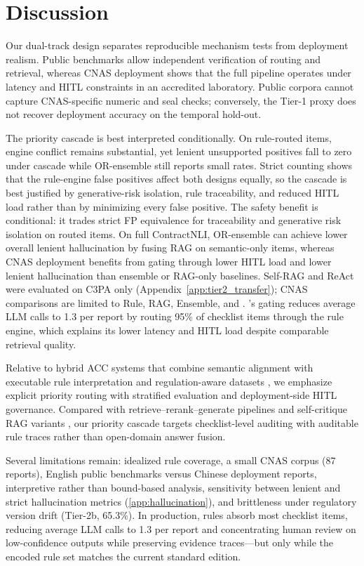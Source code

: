 \section{Discussion}
\label{sec:discussion}

Our dual-track design separates reproducible mechanism tests from deployment realism. Public benchmarks allow independent verification of routing and retrieval, whereas CNAS deployment shows that the full pipeline operates under latency and HITL constraints in an accredited laboratory. Public corpora cannot capture CNAS-specific numeric and seal checks; conversely, the Tier-1 proxy does not recover deployment accuracy on the temporal hold-out.

The priority cascade is best interpreted conditionally. On rule-routed items, engine conflict remains substantial, yet lenient unsupported positives fall to zero under cascade while OR-ensemble still reports small rates. Strict counting shows that the rule-engine false positives affect both designs equally, so the cascade is best justified by generative-risk isolation, rule traceability, and reduced HITL load rather than by minimizing every false positive. The safety benefit is conditional: it trades strict FP equivalence for traceability and generative risk isolation on routed items. On full ContractNLI, OR-ensemble can achieve lower overall lenient hallucination by fusing RAG on semantic-only items, whereas CNAS deployment benefits from gating through lower HITL load and lower lenient hallucination than ensemble or RAG-only baselines. Self-RAG and ReAct were evaluated on C3PA only (Appendix~\ref{app:tier2_transfer}); CNAS comparisons are limited to Rule, RAG, Ensemble, and \HRAG{}. \HRAG{}'s gating reduces average LLM calls to 1.3 per report by routing 95\% of checklist items through the rule engine, which explains its lower latency and HITL load despite comparable retrieval quality.

Relative to hybrid ACC systems that combine semantic alignment with executable rule interpretation \cite{zhang2016acc,zheng2022acc} and regulation-aware datasets \cite{c3pa2024,koreeda2021contractnli}, we emphasize explicit priority routing with stratified evaluation and deployment-side HITL governance. Compared with retrieve--rerank--generate pipelines and self-critique RAG variants \cite{glass2022re2g,asai2023selfrag}, our priority cascade targets checklist-level auditing with auditable rule traces rather than open-domain answer fusion.

Several limitations remain: idealized rule coverage, a small CNAS corpus (87 reports), English public benchmarks versus Chinese deployment reports, interpretive rather than bound-based analysis, sensitivity between lenient and strict hallucination metrics (\ref{app:hallucination}), and brittleness under regulatory version drift (Tier-2b, 65.3\%). In production, rules absorb most checklist items, reducing average LLM calls to 1.3 per report and concentrating human review on low-confidence outputs while preserving evidence traces---but only while the encoded rule set matches the current standard edition.
